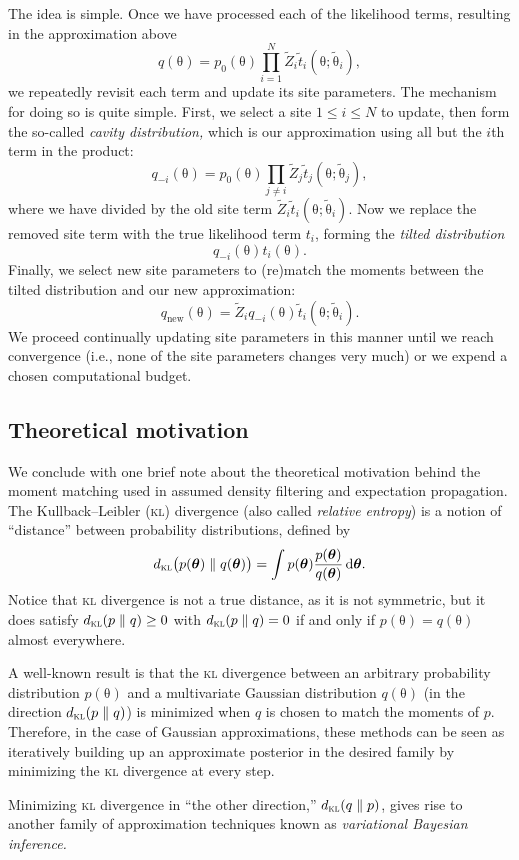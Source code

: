 \documentclass{article}
\newcommand{\acro}[1]{\textsc{\MakeLowercase{#1}}}
\newcommand{\intd}[1]{\,\mathrm{d}{#1}}
\renewcommand{\vec}[1]{\bm{\mathrm{#1}}}
\begin{document}
The idea is simple.  Once we have processed each of the likelihood
terms, resulting in the approximation above
\[
  q(\vec{\theta})
  =
  p_0(\vec{\theta})
  \prod_{i = 1}^N \tilde{Z}_i \tilde{t}_i(\vec{\theta}; \tilde{\vec{\theta}}_i),
\]
we repeatedly revisit each term and update its site parameters.  The
mechanism for doing so is quite simple.  First, we select a site $1
\leq i \leq N$ to update, then form the so-called \emph{cavity
  distribution,} which is our approximation using all but the $i$th
term in the product:
\[
  q_{-i}(\vec{\theta})
  =
  p_0(\vec{\theta})
  \prod_{j \neq i} \tilde{Z}_j \tilde{t}_j(\vec{\theta}; \tilde{\vec{\theta}}_j),
\]
where we have divided by the old site term $\tilde{Z}_i
\tilde{t}_i(\vec{\theta}; \tilde{\vec{\theta}}_i)$.  Now we replace
the removed site term with the true likelihood term $t_i$, forming the
\emph{tilted distribution}
\[
  q_{-i}(\vec{\theta})
  t_i(\vec{\theta}).
\]
Finally, we select new site parameters to (re)match the moments
between the tilted distribution and our new approximation:
\[
  q_{\text{new}}(\vec{\theta})
  =
  \tilde{Z}_i
  q_{-i}(\vec{\theta})
  \tilde{t}_i(\vec{\theta}; \tilde{\vec{\theta}}_i).
\]
We proceed continually updating site parameters in this manner until
we reach convergence (i.e., none of the site parameters changes very
much) or we expend a chosen computational budget.

\subsection*{Theoretical motivation}

We conclude with one brief note about the theoretical motivation
behind the moment matching used in assumed density filtering and
expectation propagation.  The Kullback--Leibler (\acro{KL}) divergence
(also called \emph{relative entropy}) is a notion of ``distance''
between probability distributions, defined by
\[
d_{\text{\acro{KL}}}\bigl(p(\vec{\theta}) \parallel q(\vec{\theta})\bigr)
  =
  \int
  p(\vec{\theta})
  \frac{p(\vec{\theta})}{q(\vec{\theta})}
  \intd{\vec{\theta}}.
\]
Notice that \acro{KL} divergence is not a true distance, as it is not
symmetric, but it does satisfy $d_{\text{\acro{KL}}}(p \parallel q)
\geq 0$ with $d_{\text{\acro{KL}}}(p \parallel q) = 0$ if and only if
$p(\vec{\theta}) = q(\vec{\theta})$ almost everywhere.

A well-known result is that the \acro{KL} divergence between an
arbitrary probability distribution $p(\vec{\theta})$ and a
multivariate Gaussian distribution $q(\vec{\theta})$ (in the direction
$d_{\text{\acro{KL}}}(p \parallel q)$) is minimized when $q$ is chosen
to match the moments of $p$.  Therefore, in the case of Gaussian
approximations, these methods can be seen as iteratively building up
an approximate posterior in the desired family by minimizing the
\acro{KL} divergence at every step.

Minimizing \acro{KL} divergence in ``the other direction,''
$d_{\text{\acro{KL}}}(q \parallel p)$, gives rise to another family of
approximation techniques known as \emph{variational Bayesian
  inference.}
\end{document}
